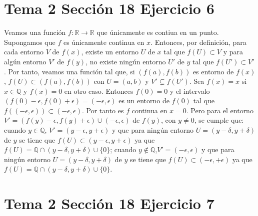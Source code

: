 \documentclass{article}
\begin{document}
\section{Tema 2 Sección 18 Ejercicio 6}
Veamos una función $f:\mathbb{R}\rightarrow \mathbb{R}$ que únicamente es contiua en un punto. Supongamos que $f$ es únicamente continua en $x$.  Entonces, por definición, para cada entorno $V$ de $f(x)$, existe un entorno $U$ de $x$ tal que $f(U)\subset V$ y para algún entorno $V'$ de $f(y)$, no existe ningún entorno $U'$ de $y$ tal que $f(U')\subset V'$. Por tanto, veamos una función tal que, si $(f(a),f(b))$ es entorno de $f(x)$, $f(U)\subset (f(a),f(b))$ con $U=(a,b)$ y $V'\subsetneq f(U')$.
Sea $f(x)=x$  si $x\in \mathbb{Q}$ y $f(x)=0$ en otro caso. Entonces $f(0)=0$ y el intervalo $(f(0)-\epsilon,f(0)+\epsilon)=(-\epsilon,\epsilon)$ es un entorno de $f(0)$ tal que $f((-\epsilon,\epsilon))\subset (-\epsilon,\epsilon)$. Por tanto es $f$ continua en $x=0$. Pero para el entorno $V'=(f(y)-\epsilon, f(y)+\epsilon)\cup(-\epsilon,\epsilon)$ de $f(y)$, con $y\neq 0$, se cumple que: cuando $y\in \mathbb{Q}$, $V'=(y-\epsilon,y+\epsilon)$ y que para ningún entorno  $U=(y-\delta,y+\delta)$ de $y$ se tiene que $f(U)\subset (y-\epsilon,y+\epsilon)$ ya que $ f(U)=\mathbb{Q}\cap (y-\delta,y+\delta)\cup\{0\}$; cuando $ y\notin \mathbb{Q}$,$V'=(-\epsilon,\epsilon)$ y que para ningún entorno  $U=(y-\delta,y+\delta)$ de $y$ se tiene que $f(U)\subset (-\epsilon,+\epsilon)$ ya que $ f(U)=\mathbb{Q}\cap (y-\delta,y+\delta)\cup\{0\}$.

\section{Tema 2 Sección 18 Ejercicio 7}
\end{document}

